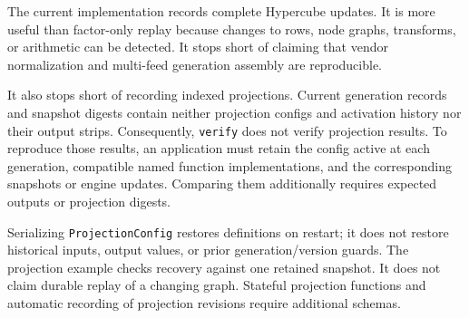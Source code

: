 \documentclass{strategynet-journal}
\begin{document}
The current implementation records complete Hypercube updates.  It is more
useful than factor-only replay because changes to rows, node graphs, transforms,
or arithmetic can be detected.  It stops short of claiming that vendor
normalization and multi-feed generation assembly are reproducible.

It also stops short of recording indexed projections.  Current generation
records and snapshot digests contain neither projection configs and activation
history nor their output strips.  Consequently, \texttt{verify} does not verify
projection results.  To reproduce those results, an application must retain the
config active at each generation, compatible named function implementations,
and the corresponding snapshots or engine updates.  Comparing them additionally
requires expected outputs or projection digests.

Serializing \texttt{ProjectionConfig} restores definitions on restart; it does
not restore historical inputs, output values, or prior generation/version guards.
The projection example checks recovery against one retained snapshot.  It does
not claim durable replay of a changing graph.  Stateful projection functions and
automatic recording of projection revisions require additional schemas.
\end{document}
